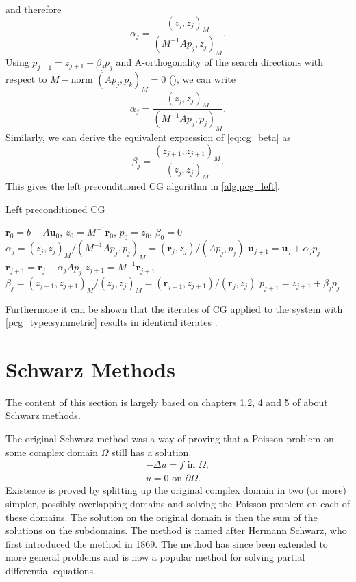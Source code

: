 and therefore
\[
  \alpha_j = \frac{(z_j, z_j)_M}{(M^{-1}Ap_j, z_j)_M}.
\]
Using $p_{j+1} = z_{j+1} + \beta_j p_j$ and A-orthogonality of the search directions with respect to $M-$norm $(Ap_j, p_k)_M = 0$ (), we can write
\[
  \alpha_j = \frac{(z_j, z_j)_M}{(M^{-1}Ap_j, p_j)_M}.
\]
Similarly, we can derive the equivalent expression of \cref{eq:cg_beta} as
\[
  \beta_j = \frac{(z_{j+1}, z_{j+1})_M}{(z_j, z_j)_M}.
\]
This gives the left preconditioned CG algorithm in \cref{alg:pcg_left}.
\begin{algorithm}[H]
  \caption{Left preconditioned CG \cite[Algorithm 9.1]{iter_method_saad}}
  \label{alg:pcg_left}
  \begin{algorithmic}
    \State $\mathbf{r}_0 = b - A\mathbf{u}_0$, $z_0 = M^{-1}\mathbf{r}_0$, $p_0 = z_0$, $\beta_0 = 0$
    \State $\alpha_j = (z_j, z_j)_M / (M^{-1}Ap_j, p_j)_M = (\mathbf{r}_j, z_j) / (Ap_j, p_j)$
    \State $\mathbf{u}_{j+1} = \mathbf{u}_j + \alpha_j p_j$
    \State $\mathbf{r}_{j+1} = \mathbf{r}_j - \alpha_j A p_j$
    \State $z_{j+1} = M^{-1}\mathbf{r}_{j+1}$
    \State $\beta_j = (z_{j+1}, z_{j+1})_M / (z_j, z_j)_M = (\mathbf{r}_{j+1}, z_{j+1}) / (\mathbf{r}_j, z_j)$
    \State $p_{j+1} = z_{j+1} + \beta_j p_j$
    \EndFor
  \end{algorithmic}
\end{algorithm}
Furthermore it can be shown that the iterates of CG applied to the system with \cref{pcg_type:symmetric} results in identical iterates \cite[Algorithm 9.2]{iter_method_saad}.

\section{Schwarz Methods}\label{sec:schwarz_methods}
The content of this section is largely based on chapters 1,2, 4 and 5 of \citeauthor{schwarz_methods_Dolean_2015} about Schwarz methods.

The original Schwarz method was a way of proving that a Poisson problem on some complex domain $\Omega$ still has a solution.
\begin{equation}
    \begin{array}{c}
        -\Delta u = f \text{ in } \Omega, \\
        u = 0 \text{ on } \partial \Omega.
    \end{array}
    \label{eq:poisson_problem}
\end{equation}
Existence is proved by splitting up the original complex domain in two (or more) simpler, possibly overlapping domains and solving the Poisson problem on each of these domains. The solution on the original domain is then the sum of the solutions on the subdomains. The method is named after Hermann Schwarz, who first introduced the method in 1869. The method has since been extended to more general problems and is now a popular method for solving partial differential equations.

